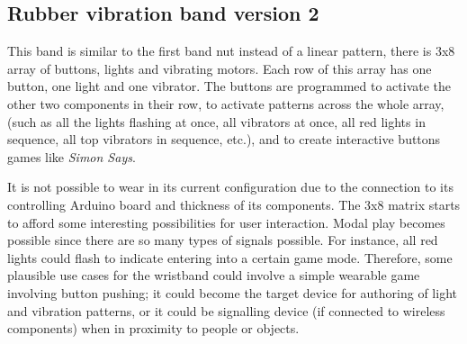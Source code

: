 \documentclass{chi-ext}
\begin{document}
\subsection{Rubber vibration band version 2}
This band is similar to the first band nut instead of a linear pattern, there is 3x8 array of buttons, lights and vibrating motors. Each row of this array has one button, one light and one vibrator. The buttons are programmed to activate the other two components in their row, to activate patterns across the whole array, (such as all the lights flashing at once, all vibrators at once, all red lights in sequence, all top vibrators in sequence, etc.), and to create interactive buttons games like \emph{Simon Says}.

It is not possible to wear in its current configuration due to the connection to its controlling Arduino board and thickness of its components.  The 3x8 matrix starts to afford some interesting possibilities for user interaction. Modal play becomes possible since there are so many types of signals possible. For instance, all red lights could flash to indicate entering into a certain game mode. Therefore, some plausible use cases for the wristband could involve a simple wearable game involving button pushing; it could become the target device for authoring of light and vibration patterns, or it could be signalling device (if connected to wireless components) when in proximity to people or objects.
\end{document}
